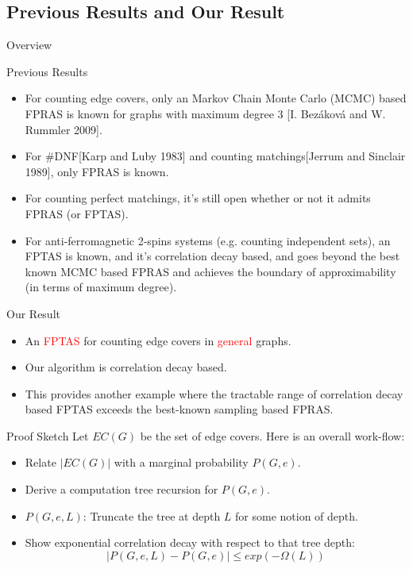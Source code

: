 \documentclass[mathserif]{beamer}
\newcommand{\abs}[1]{\left\vert#1\right\vert}
\begin{document}
\subsection{Previous Results and Our Result}
\begin{frame}{Overview}
	\tableofcontents[currentsubsection, hideothersubsections, sectionstyle=show/shaded, subsectionstyle=show/shaded]
\end{frame}
\begin{frame}{Previous Results}
	\begin{itemize}
		\item For counting edge covers, only an Markov Chain Monte Carlo (MCMC) based FPRAS is known for graphs with maximum degree $3$ [I. Bezáková and W. Rummler 2009].
			\pause
		\item For \#DNF[Karp and Luby 1983] and counting matchings[Jerrum and Sinclair 1989], only FPRAS is known.
			\pause
		\item For counting perfect matchings, it's still open whether or not it admits FPRAS (or FPTAS).
			\pause
		\item For anti-ferromagnetic 2-spins systems (e.g. counting independent sets), an FPTAS is known, and it's correlation decay based, and goes beyond the best known MCMC based FPRAS and achieves the boundary of approximability (in terms of maximum degree).
	\end{itemize}

\end{frame}
\begin{frame}{Our Result}
	\begin{itemize}
		\item An \textcolor{red}{FPTAS} for counting edge covers in \textcolor{red}{general} graphs.
		\item Our algorithm is correlation decay based.
		\item This provides another example where the tractable range of correlation decay based FPTAS exceeds the best-known sampling based FPRAS.
	\end{itemize}

\end{frame}

\begin{frame}{Proof Sketch}
Let $EC(G)$ be the set of edge covers.
Here is an overall work-flow:
\begin{itemize}
  \item Relate $\abs{EC(G)}$ with a marginal probability $P(G,e)$.
  \item Derive a computation tree recursion for $P(G,e)$.
  \item $P(G,e,L)$: Truncate the tree at depth $L$ for some notion of depth.
  \item{ Show exponential correlation decay with respect to that tree depth:
  \[
    \abs{ P(G,e,L) - P(G,e) } \leq exp(-\Omega(L))
  \]}
\end{itemize}
\end{frame}
\end{document}
